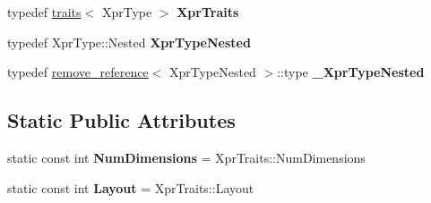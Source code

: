 \begin{DoxyCompactItemize}
\item 
\mbox{\label{struct_eigen_1_1internal_1_1traits_3_01_tensor_cwise_unary_op_3_01_unary_op_00_01_xpr_type_01_4_01_4_ad6706d25293db12d9c9add68d3cdc572}} 
typedef \hyperlink{struct_eigen_1_1internal_1_1traits}{traits}$<$ Xpr\+Type $>$ {\bfseries Xpr\+Traits}
\item 
\mbox{\label{struct_eigen_1_1internal_1_1traits_3_01_tensor_cwise_unary_op_3_01_unary_op_00_01_xpr_type_01_4_01_4_a02ac4d871836be88b0f1543c9e3c3897}} 
typedef Xpr\+Type\+::\+Nested {\bfseries Xpr\+Type\+Nested}
\item 
\mbox{\label{struct_eigen_1_1internal_1_1traits_3_01_tensor_cwise_unary_op_3_01_unary_op_00_01_xpr_type_01_4_01_4_a87688dae0228a1a8c468564fb9dcb397}} 
typedef \hyperlink{struct_eigen_1_1internal_1_1remove__reference}{remove\+\_\+reference}$<$ Xpr\+Type\+Nested $>$\+::type {\bfseries \+\_\+\+Xpr\+Type\+Nested}
\end{DoxyCompactItemize}
\subsection*{Static Public Attributes}
\begin{DoxyCompactItemize}
\item 
\mbox{\label{struct_eigen_1_1internal_1_1traits_3_01_tensor_cwise_unary_op_3_01_unary_op_00_01_xpr_type_01_4_01_4_a93b28d8e463dab1015e61dff7b6c9ff8}} 
static const int {\bfseries Num\+Dimensions} = Xpr\+Traits\+::\+Num\+Dimensions
\item 
\mbox{\label{struct_eigen_1_1internal_1_1traits_3_01_tensor_cwise_unary_op_3_01_unary_op_00_01_xpr_type_01_4_01_4_a78253f0f654e7691b473e36133f305a2}} 
static const int {\bfseries Layout} = Xpr\+Traits\+::\+Layout
\end{DoxyCompactItemize}


